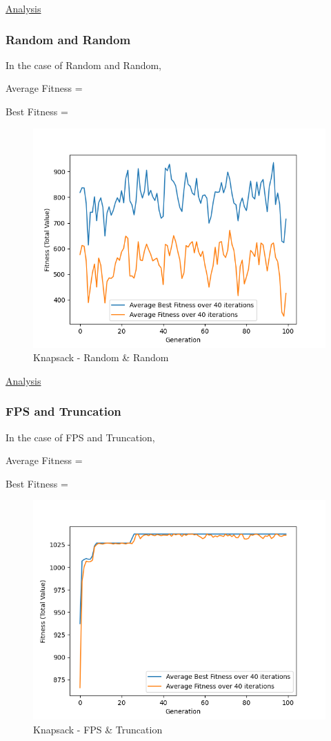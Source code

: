 \documentclass[11pt, letterpaper]{article}
\begin{document}
\underline{Analysis}
\subsubsection {Random and Random}
In the case of Random and Random,

Average Fitness = 

Best Fitness = 
\begin{figure}[H]
    \centering
    \includegraphics[scale = 0.6]{images/knapsack_rd_rd.png}
    \caption {Knapsack - Random \& Random}
    \label {fig:kpRR}
\end{figure}

\underline{Analysis}
\subsubsection {FPS and Truncation}
In the case of FPS and Truncation,

Average Fitness = 

Best Fitness = 
\begin{figure}[H]
    \centering
    \includegraphics[scale = 0.6]{images/knapsack_fp_tr.png}
    \caption {Knapsack - FPS \& Truncation}
    \label {fig:kpFT}
\end{figure}
\end{document}
